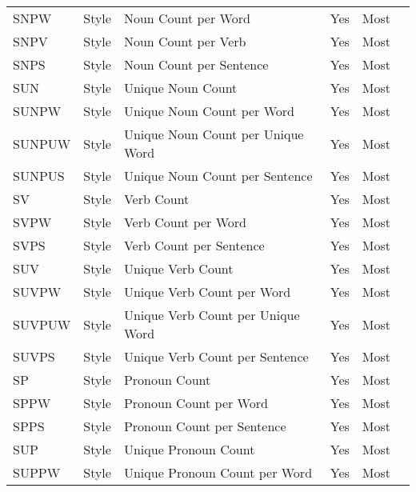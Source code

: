 \begin{longtable}{l l m{} c c m{}}
    SNPW & Style & Noun Count per Word & Yes & Most & \cite{Xu2011_lr30, Bassani2019_lr359} \\
    SNPV & Style & Noun Count per Verb & Yes & Most & \cite{Lewoniewski2018_lr149} \\
    SNPS & Style & Noun Count per Sentence & Yes & Most & \cite{Bassani2019_lr359} \\
    SUN & Style & Unique Noun Count & Yes & Most & \cite{Lewoniewski2018_lr149, Bassani2019_lr359} \\
    SUNPW & Style & Unique Noun Count per Word & Yes & Most & \cite{Bassani2019_lr359} \\
    SUNPUW & Style & Unique Noun Count per Unique Word & Yes & Most & \cite{Xu2011_lr30, Bassani2019_lr359} \\
    SUNPUS & Style & Unique Noun Count per Sentence & Yes & Most & \cite{Bassani2019_lr359} \\
    SV & Style & Verb Count & Yes & Most & \cite{Bassani2019_lr359, Olcer2022_lr2017} \\
    SVPW & Style & Verb Count per Word & Yes & Most & \cite{Xu2011_lr30, Bassani2019_lr359} \\
    SVPS & Style & Verb Count per Sentence & Yes & Most & \cite{Bassani2019_lr359} \\
    SUV & Style & Unique Verb Count & Yes & Most & \cite{Lewoniewski2018_lr149, Bassani2019_lr359} \\
    SUVPW & Style & Unique Verb Count per Word & Yes & Most & \cite{Bassani2019_lr359} \\
    SUVPUW & Style & Unique Verb Count per Unique Word & Yes & Most & \cite{Xu2011_lr30, Bassani2019_lr359} \\
    SUVPS & Style & Unique Verb Count per Sentence & Yes & Most & \cite{Bassani2019_lr359} \\
    SP & Style & Pronoun Count & Yes & Most & \cite{Dalip2009_lr14, Wang2020_lr26, Bassani2019_lr359, Dalip2016_lr1002, Dalip2011_lr1003, Dalip2014_lr1004, Magalhaes2019_lr2028} \\
    SPPW & Style & Pronoun Count per Word & Yes & Most & \cite{Anderka2012_lr17, Ferretti2012_lr115, Pereyra2019_lr147, Bassani2019_lr359} \\
    SPPS & Style & Pronoun Count per Sentence & Yes & Most & \cite{Bassani2019_lr359} \\
    SUP & Style & Unique Pronoun Count & Yes & Most & \cite{Bassani2019_lr359} \\
    SUPPW & Style & Unique Pronoun Count per Word & Yes & Most & \cite{Bassani2019_lr359} \\

\end{longtable}
